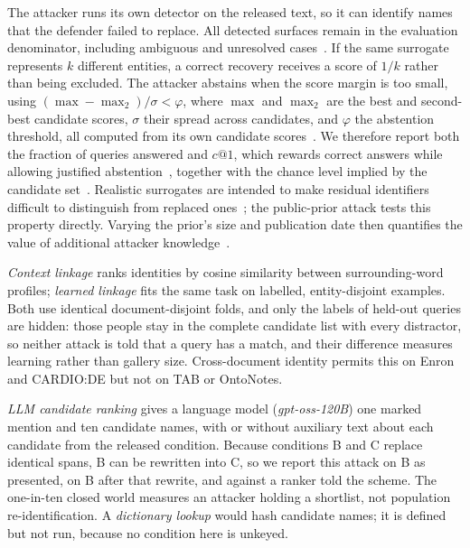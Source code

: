 The attacker runs its own detector on the released text, so it can identify names that the defender failed to replace. All detected surfaces remain in the evaluation denominator, including ambiguous and unresolved cases~\cite{dankar2012estimating}. If the same surrogate represents $k$ different entities, a correct recovery receives a score of $1/k$ rather than being excluded. The attacker abstains when the score margin is too small, using $(\max-\max_2)/\sigma < \varphi$, where $\max$ and $\max_2$ are the best and second-best candidate scores, $\sigma$ their spread across candidates, and $\varphi$ the abstention threshold, all computed from its own candidate scores~\cite{narayanan2008robust}. We therefore report both the fraction of queries answered and $c@1$, which rewards correct answers while allowing justified abstention~\cite{penas2011simple}, together with the chance level implied by the candidate set~\cite{rocher2019estimating}. Realistic surrogates are intended to make residual identifiers difficult to distinguish from replaced ones~\cite{carrell2013hiding}; the public-prior attack tests this property directly. Varying the prior's size and publication date then quantifies the value of additional attacker knowledge~\cite{bindschaedler2018cryptanalysis}.

\emph{Context linkage} ranks identities by cosine similarity between surrounding-word profiles;
\emph{learned linkage} fits the same task on labelled, entity-disjoint examples. Both use identical
document-disjoint folds, and only the labels of held-out queries are hidden: those people stay in
the complete candidate list with every distractor, so neither attack is told that a query has a
match, and their difference measures learning rather than gallery size. Cross-document identity
permits this on Enron and CARDIO:DE but not on TAB or OntoNotes.

\emph{LLM candidate ranking} gives a language model (\emph{gpt-oss-120B}) one marked mention and ten candidate names, with
or without auxiliary text about each candidate from the released condition. Because conditions B and C replace
identical spans, B can be rewritten into C, so we report this attack on B as presented, on B after
that rewrite, and against a ranker told the scheme. The one-in-ten closed world measures an attacker
holding a shortlist, not population re-identification. A \emph{dictionary lookup} would hash
candidate names; it is defined but not run, because no condition here is unkeyed.
